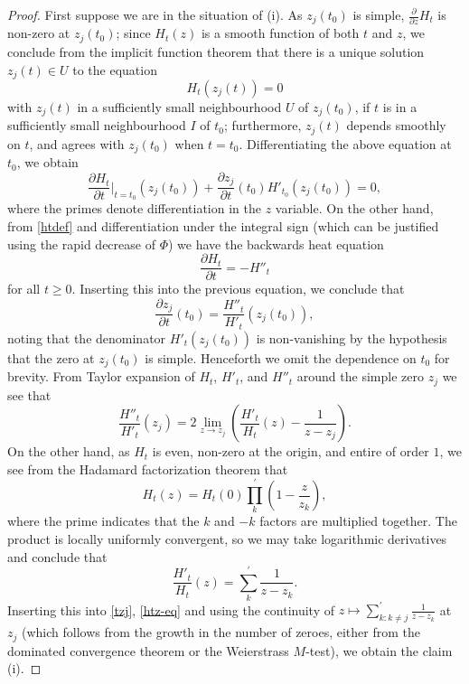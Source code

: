 \begin{proof}  First suppose we are in the situation of (i).  As $z_j(t_0)$ is simple, $\frac{\partial}{\partial z} H_t$ is non-zero at $z_j(t_0)$; since $H_t(z)$ is a smooth function of both $t$ and $z$, we conclude from the implicit function theorem that there is a unique solution $z_j(t) \in U$ to the equation
$$ H_t( z_j(t) ) = 0$$
with $z_j(t)$ in a sufficiently small neighbourhood $U$ of $z_j(t_0)$, if $t$ is in a sufficiently small neighbourhood $I$ of $t_0$; furthermore, $z_j(t)$ depends smoothly on $t$, and agrees with $z_j(t_0)$ when $t=t_0$.  Differentiating the above equation at $t_0$, we obtain
$$ \frac{\partial H_t}{\partial t}|_{t=t_0}( z_j(t_0) ) + \frac{\partial z_j}{\partial t}(t_0) H'_{t_0}(z_j(t_0)) = 0,$$
where the primes denote differentiation in the $z$ variable.
On the other hand, from \eqref{htdef} and differentiation under the integral sign (which can be justified using the rapid decrease of $\Phi$) we have the backwards heat equation
\begin{equation}\label{back}
\frac{\partial H_t}{\partial t} = -H''_t
\end{equation}
for all $t \geq 0$.  Inserting this into the previous equation, we conclude that
\begin{equation}\label{tzj}
\frac{\partial z_j}{\partial t}(t_0)  = \frac{H''_t}{H'_t}( z_j(t_0) ),
\end{equation}
noting that the denominator $H'_t(z_j(t_0))$ is non-vanishing by the hypothesis that the zero at $z_j(t_0)$ is simple.  Henceforth we omit the dependence on $t_0$ for brevity.  From Taylor expansion of $H_t$, $H'_t$, and $H''_t$ around the simple zero $z_j$ we see that
\begin{equation}\label{htz-eq}
 \frac{H''_t}{H'_t}( z_j) = 2 \lim_{z \to z_j}\left(  \frac{H'_t}{H_t}( z) - \frac{1}{z-z_j} \right).
\end{equation}
On the other hand, as $H_t$ is even, non-zero at the origin, and entire of order $1$, we see from the Hadamard factorization theorem that
$$ H_t(z) = H_t(0) \prod_k^{\prime} \left(1 - \frac{z}{z_k}\right),$$
where the prime indicates that the $k$ and $-k$ factors are multiplied together.  The product is locally uniformly convergent, so we may take logarithmic derivatives and conclude that
$$ \frac{H'_t}{H_t}(z) = \sum_k^{\prime} \frac{1}{z-z_k}.$$
Inserting this into \eqref{tzj}, \eqref{htz-eq} and using the continuity of $z \mapsto \sum_{k: k \neq j}^\prime \frac{1}{z-z_k}$ at $z_j$ (which follows from the growth in the number of zeroes, either from the dominated convergence theorem or the Weierstrass $M$-test), we obtain the claim (i).


\end{proof}
